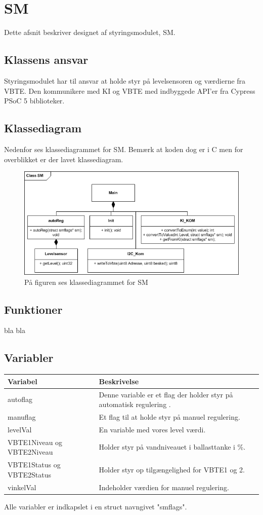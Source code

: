 \chapter{SM}
Dette afsnit beskriver designet af styringsmodulet, SM.
\section{Klassens ansvar}
Styringsmodulet har til ansvar at holde styr på levelsensoren og værdierne fra VBTE. Den kommunikere med KI og VBTE med indbyggede API'er fra Cypress PSoC 5 biblioteker. 
\section{Klassediagram}
Nedenfor ses klassediagrammet for SM. Bemærk at koden dog er i C men for overblikket er der lavet klassediagram.
\begin{figure}[H]
\centering
\includegraphics[width=1\textwidth]{billeder/smKlassediagram}
\caption{På figuren ses klassediagrammet for SM}
\end{figure}
\section{Funktioner}
bla bla
\section{Variabler}
\begin{table}[H]
\begin{tabular}{|l|p{10cm}|}
\hline
\cellcolor[gray]{0.8}\textbf{Variabel} &\cellcolor[gray]{0.8} \textbf{Beskrivelse}\\ \hline
autoflag & Denne variable er et flag der holder styr på automatisk regulering .\\ \hline
manuflag & Et flag til at holde styr på manuel regulering.\\ \hline
levelVal & En variable med vores level værdi.\\ \hline
VBTE1Niveau og VBTE2Niveau & Holder styr på vandniveauet i ballasttanke i \%. \\ \hline
VBTE1Status og VBTE2Status & Holder styr op tilgængelighed for VBTE1 og 2.\\ \hline
vinkelVal & Indeholder værdien for manuel regulering.\\ \hline
\end{tabular}
\end{table}
Alle variabler er indkapslet i en struct navngivet "smflags".

